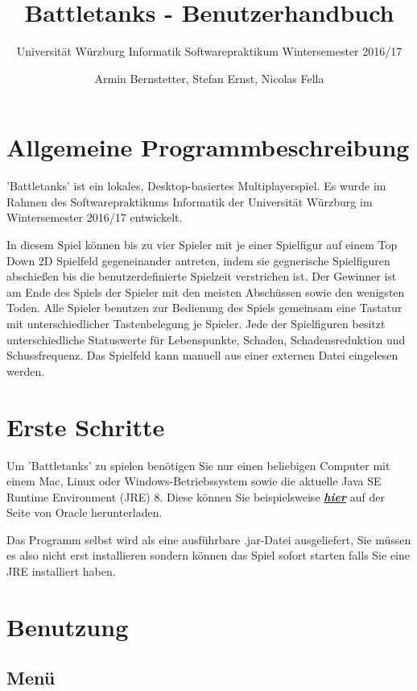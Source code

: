\documentclass[a4paper]{scrartcl}
\title{Battletanks - Benutzerhandbuch}
\subtitle{Universität Würzburg Informatik Softwarepraktikum Wintersemester 2016/17}
\author{Armin Bernstetter, Stefan Ernst, Nicolas Fella}
\begin{document}
\maketitle
\tableofcontents
\newpage

\section{Allgemeine Programmbeschreibung}
'Battletanks' ist ein lokales, Desktop-basiertes Multiplayerspiel. Es wurde im Rahmen des Softwarepraktikums Informatik der Universität Würzburg im Wintersemester 2016/17 entwickelt.

In diesem Spiel können bis zu vier Spieler mit je einer Spielfigur auf einem Top Down 2D Spielfeld gegeneinander antreten, indem sie gegnerische Spielfiguren abschießen bis die benutzerdefinierte Spielzeit verstrichen ist. Der Gewinner ist am Ende des Spiels der Spieler mit den meisten Abschüssen sowie den wenigsten Toden.
Alle Spieler benutzen zur Bedienung des Spiels gemeinsam eine Tastatur mit unterschiedlicher Tastenbelegung je Spieler. Jede der Spielfiguren besitzt unterschiedliche Statuswerte für Lebenspunkte, Schaden, Schadensreduktion und Schussfrequenz.
Das Spielfeld kann manuell aus einer externen Datei eingelesen werden.



\section{Erste Schritte}
Um 'Battletanks' zu spielen benötigen Sie nur einen beliebigen Computer mit einem Mac, Linux oder Windows-Betriebssystem sowie die aktuelle Java SE Runtime Environment (JRE) 8. Diese können Sie beispielsweise \href{http://www.oracle.com/technetwork/java/javase/downloads/jre8-downloads-2133155.html}{\textbf{\textit{hier}}} auf der Seite von Oracle herunterladen.

Das Programm selbst wird als eine ausführbare .jar-Datei ausgeliefert, Sie müssen es also nicht erst installieren sondern können das Spiel sofort starten falls Sie eine JRE installiert haben.

\newpage
\section{Benutzung}
\subsection{Menü}
\end{document}
